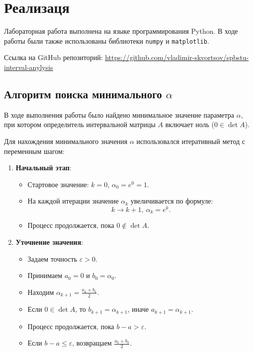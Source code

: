 \documentclass{article}
\begin{document}
  \section{Реализаця}

  Лабораторная работа выполнена на языке программирования Python. В ходе
  работы были также использованы библиотеки \verb!numpy! и
  \verb!matplotlib!.

  Ссылка на GitHub репозиторий:
  \href{https://github.com/vladimir-skvortsov/spbstu-interval-anylysis}{https://github.com/vladimir-skvortsov/spbstu-interval-anylysis}

  \subsection{Алгоритм поиска минимального \( \alpha \)}

  В ходе выполнения работы было найдено минимальное значение параметра
  \( \alpha \), при котором определитель интервальной матрицы \( A \)
  включает ноль (\( 0 \in \det A \)).

  Для нахождения минимального значения \(\alpha\) использовался
  итеративный метод с переменным шагом:

  \begin{enumerate}
    \item \textbf{Начальный этап}:
      \begin{itemize}
        \item Стартовое значение: \( k = 0 \), \(\alpha_0 = e^0 = 1\).
        \item На каждой итерации значение \( \alpha_k \) увеличивается по формуле:
          \[ k \to k + 1, \ \alpha_{k} = e^{k}. \]
        \item Процесс продолжается, пока \( 0 \notin \det A \).
      \end{itemize}

    \item \textbf{Уточнение значения}:
      \begin{itemize}
        \item Задаем точность \( \varepsilon > 0 \).
        \item Принимаем \( a_0 = 0 \) и \( b_0 = \alpha_0 \).
        \item Находим \( \alpha_{k+1} = \frac{a_k + b_k}{2} \).
        \item Если \( 0 \in \det A \), то \( b_{k+1} = \alpha_{k+1} \),
          иначе \( a_{k+1} = \alpha_{k+1} \).
        \item Процесс продолжается, пока \( b - a > \varepsilon \).
        \item Если \( b - a \leqslant \varepsilon \), возвращаем
          \( \frac{a_k + b_k}{2} \).
      \end{itemize}
  \end{enumerate}
\end{document}
